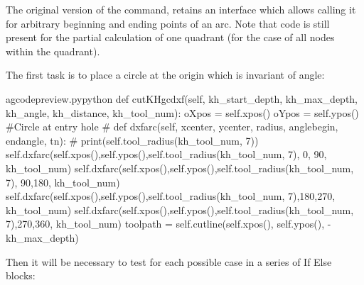 \documentclass{ltxdoc}
\begin{document}
The original version of the command,  retains an interface which allows calling it for arbitrary beginning and ending points of an arc. Note that code is still present for the partial calculation of one quadrant (for the case of all nodes within the quadrant).

The first task is to place a circle at the origin which is invariant of angle:
 
\lstset{firstnumber=\thegcpy}
\begin{writecode}{a}{gcodepreview.py}{python}
    def cutKHgcdxf(self, kh_start_depth, kh_max_depth, kh_angle, kh_distance, kh_tool_num):
        oXpos = self.xpos()
        oYpos = self.ypos()
#Circle at entry hole
#    def dxfarc(self, xcenter, ycenter, radius, anglebegin, endangle, tn):
#        print(self.tool_radius(kh_tool_num, 7))
        self.dxfarc(self.xpos(),self.ypos(),self.tool_radius(kh_tool_num, 7),  0, 90, kh_tool_num)
        self.dxfarc(self.xpos(),self.ypos(),self.tool_radius(kh_tool_num, 7), 90,180, kh_tool_num)
        self.dxfarc(self.xpos(),self.ypos(),self.tool_radius(kh_tool_num, 7),180,270, kh_tool_num)
        self.dxfarc(self.xpos(),self.ypos(),self.tool_radius(kh_tool_num, 7),270,360, kh_tool_num)
        toolpath = self.cutline(self.xpos(), self.ypos(), -kh_max_depth)

\end{writecode}
\addtocounter{gcpy}{12}

Then it will be necessary to test for each possible case in a series of If Else blocks:
 
\end{document}
